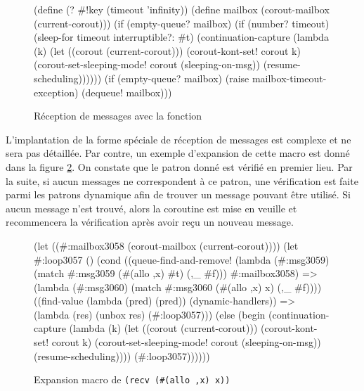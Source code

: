 \documentclass[12pt,oneside,letterpaper,francais]{book}
\newcommand{\scheme}[1]{\selectlanguage{english}{\tt #1}\selectlanguage{french}}
\begin{document}
\begin{figure}[htb!]
  \begin{schemecode}
(define (? \#!key (timeout 'infinity))
  (define mailbox (corout-mailbox (current-corout)))
  (if (empty-queue? mailbox)
      (if (number? timeout)
          (sleep-for timeout interruptible?: \#t)
          (continuation-capture
           (lambda (k)
             (let ((corout (current-corout)))
               (corout-kont-set! corout k)
               (corout-set-sleeping-mode! corout (sleeping-on-msg))
               (resume-scheduling))))))
  (if (empty-queue? mailbox)
      (raise mailbox-timeout-exception)
      (dequeue! mailbox)))
  \end{schemecode}
  \caption{Réception de messages avec la fonction \scheme{?}}
  \label{Corout:?}
\end{figure}

L'implantation de la forme spéciale de réception de messages
\scheme{recv} est complexe et ne sera pas détaillée. Par contre, un
exemple d'expansion de cette macro est donné dans la figure
\ref{Corout:recv-exp}. On constate que le patron donné est vérifié en
premier lieu. Par la suite, si aucun messages ne correspondent à ce
patron, une vérification est faite parmi les patrons dynamique afin de
trouver un message pouvant être utilisé. Si aucun message n'est
trouvé, alors la coroutine est mise en veuille et recommencera la
vérification après avoir reçu un nouveau message.

\begin{figure}[htb!]
  \begin{schemecode}
(let ((\#:mailbox3058 (corout-mailbox (current-corout))))
  (let \#:loop3057 ()
    (cond ((queue-find-and-remove!
            (lambda (\#:msg3059) (match \#:msg3059 (\#(allo ,x) \#t) (,\_ \#f)))
            \#:mailbox3058)
           =>
           (lambda (\#:msg3060) (match \#:msg3060 (\#(allo ,x) x) (,\_ \#f))))
          ((find-value (lambda (pred) (pred)) (dynamic-handlers))
           =>
           (lambda (res) (unbox res) (\#:loop3057)))
          (else
           (begin
             (continuation-capture
              (lambda (k)
                (let ((corout (current-corout)))
                  (corout-kont-set! corout k)
                  (corout-set-sleeping-mode! corout (sleeping-on-msg))
                  (resume-scheduling))))
             (\#:loop3057))))))
  \end{schemecode}
  \caption{Expansion macro de \texttt{(recv (\#(allo ,x) x))}}
  \label{Corout:recv-exp}
\end{figure}
\end{document}
